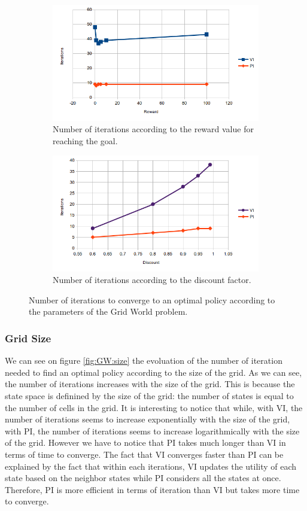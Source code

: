 \documentclass[10pt, twocolumn]{article}
\begin{document}
\begin{figure}[]
\begin{subfigure}[t]{0.49\textwidth}
						\label{fig:GW:obstacles}
					\end{subfigure}
					\begin{subfigure}[t]{0.49\textwidth}
						\centering
						\includegraphics[width=.7\textwidth]{../graphics/GridWorld_reward_iterations.png}
						\caption{Number of iterations according to the reward value for reaching the goal.}
						\label{fig:GW:reward}
					\end{subfigure}
					\begin{subfigure}[t]{0.49\textwidth}
						\centering
						\includegraphics[width=.7\textwidth]{../graphics/GridWorld_discount_iterations.png}
						\caption{Number of iterations according to the discount factor.}
						\label{fig:GW:discount}
					\end{subfigure}
					\caption{Number of iterations to converge to an optimal policy according to the parameters of the Grid World problem.}
					\label{fig:GW:iterations}
				\end{figure}
			\subsubsection*{Grid Size}
				We can see on figure \ref{fig:GW:size} the evoluation of the number of iteration needed to find an optimal policy according to the size of the grid. As we can see, the number of iterations increases with the size of the grid. This is because the state space is definined by the size of the grid: the number of states is equal to the number of cells in the grid. It is interesting to notice that while, with VI, the number of iterations seems to increase exponentially with the size of the grid, with PI, the number of iterations seems to increase logarithmically with the size of the grid. However we have to notice that PI takes much longer than VI in terms of time to converge. The fact that VI converges faster than PI can be explained by the fact that within each iterations, VI updates  the utility of each state based on the neighbor states while PI considers all the states at once. Therefore, PI is more efficient in terms of iteration than VI but takes more time to converge.
\end{document}
